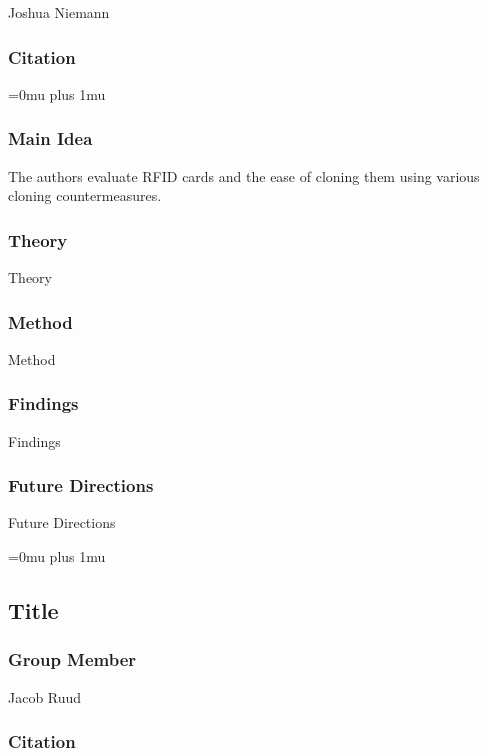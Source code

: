 \noindent
Joshua Niemann

\noindent
\subsubsection{Citation}

\Urlmuskip=0mu plus 1mu\relax

\subsubsection{Main Idea}

\noindent
The authors evaluate RFID cards and the ease of cloning them using various cloning countermeasures.

\subsubsection{Theory}

\noindent
Theory

\subsubsection{Method}

\noindent
Method

\subsubsection{Findings}

\noindent
Findings

\subsubsection{Future Directions}

\noindent
Future Directions 

\Urlmuskip=0mu plus 1mu\relax

\noindent
\subsection{Title}

\subsubsection{Group Member}

\noindent
Jacob Ruud

\noindent
\subsubsection{Citation}

